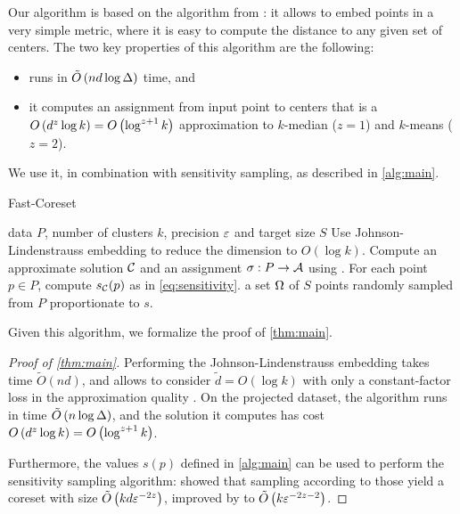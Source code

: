 Our algorithm is based on the \fkmeans algorithm from \cite{cohen2020fast}: it allows to embed points in a very simple metric,  where it is easy to compute the
distance to any given set of centers. The two key properties of this algorithm are the following: 
\begin{itemize}
\item \fkmeans runs in $\tilde O\left( n d \log \Delta\right)$ time, and
\item it computes an assignment from input point to centers that is a $O\left( d^z \log k\right) = O\left(\log^{z+1} k\right)$ approximation to $k$-median ($z=1$) and
$k$-means ($z=2$).
\end{itemize}
  We use it, in combination with sensitivity sampling, as described in \cref{alg:main}.


\begin{algorithm}[tb]
   \caption{Fast-Coreset}
   \label{alg:main}
\begin{algorithmic}
    data $P$, number of clusters $k$, precision $\varepsilon$ and target size $S$
   \STATE Use Johnson-Lindenstrauss embedding to reduce the dimension to $O(\log k)$.
   \STATE Compute an approximate solution $\mathcal C$ and an assignment $\sigma : P \rightarrow \mathcal A$ using \fkmeans.
   \STATE For each point $p \in P$, compute $s_\mathcal C(p)$ as in \cref{eq:sensitivity}.
    a set $\Omega$ of $S$ points randomly sampled from $P$ proportionate to $s$.
\end{algorithmic}
\end{algorithm}


Given this algorithm, we formalize the proof of \cref{thm:main}.

\begin{proof}[Proof of \cref{thm:main}]
Performing the Johnson-Lindenstrauss embedding takes time $\tilde O(nd)$, and allows to consider $\tilde d=O(\log k)$ with only a constant-factor loss in the approximation quality  \cite{makarychev2019performance}. 
On the projected dataset, the algorithm \fkmeans runs in time $\tilde O\left( n \log \Delta\right)$, and the solution it computes has cost $O\left( d^z \log k\right) = O\left(\log^{z+1} k\right)$. 

Furthermore, the values $s(p)$ defined in \cref{alg:main} can be used to perform the sensitivity sampling algorithm: \cite{FeldmanL11} showed that sampling according to those yield a coreset with size $\tilde O \left( k d \varepsilon^{-2z}\right)$, improved by \cite{HuangV20} to $\tilde O \left( k \varepsilon^{-2z -2} \right)$.
\end{proof}

